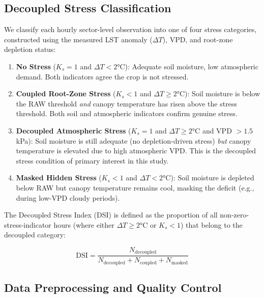 \documentclass[review,12pt]{elsarticle}
\begin{document}
\subsection{Decoupled Stress Classification}
\label{subsec:classification}

We classify each hourly sector-level observation into one of four stress categories, constructed using the measured LST anomaly ($\Delta T$), VPD, and root-zone depletion status:

\begin{enumerate}
  \item \textbf{No Stress} ($K_s = 1$ and $\Delta T < 2$°C): Adequate soil moisture, low atmospheric demand. Both indicators agree the crop is not stressed.

  \item \textbf{Coupled Root-Zone Stress} ($K_s < 1$ and $\Delta T \geq 2$°C): Soil moisture is below the RAW threshold \textit{and} canopy temperature has risen above the stress threshold. Both soil and atmospheric indicators confirm genuine stress.

  \item \textbf{Decoupled Atmospheric Stress} ($K_s = 1$ and $\Delta T \geq 2$°C and VPD $> 1.5$ kPa): Soil moisture is still adequate (no depletion-driven stress) \textit{but} canopy temperature is elevated due to high atmospheric VPD. This is the decoupled stress condition of primary interest in this study.

  \item \textbf{Masked Hidden Stress} ($K_s < 1$ and $\Delta T < 2$°C): Soil moisture is depleted below RAW but canopy temperature remains cool, masking the deficit (e.g., during low-VPD cloudy periods).
\end{enumerate}

The Decoupled Stress Index (DSI) is defined as the proportion of all non-zero-stress-indicator hours (where either $\Delta T \geq 2$°C or $K_s < 1$) that belong to the decoupled category:

\begin{equation}
\text{DSI} = \frac{N_\text{decoupled}}{N_\text{decoupled} + N_\text{coupled} + N_\text{masked}}
\label{eq:dsi}
\end{equation}

\subsection{Data Preprocessing and Quality Control}
\label{subsec:preprocessing}
\end{document}
